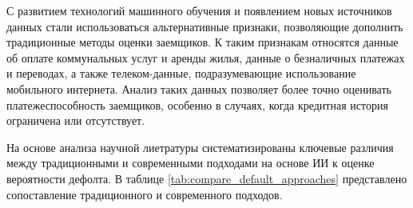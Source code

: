 С развитием технологий машинного обучения и появлением новых источников данных стали использоваться альтернативные признаки, позволяющие дополнить традиционные методы оценки заемщиков. К таким признакам относятся данные об оплате коммунальных услуг и аренды жилья, данные о безналичных платежах и переводах, а также телеком-данные, подразумевающие использование мобильного интернета. Анализ таких данных позволяет более точно оценивать платежеспособность заемщиков, особенно в случаях, когда кредитная история ограничена или отсутствует. 

На основе анализа научной лиетратуры систематизированы ключевые различия между традиционными и современными подходами на основе ИИ к оценке вероятности дефолта. В таблице \ref{tab:compare_default_approaches} представлено сопоставление традиционного и современного подходов.

